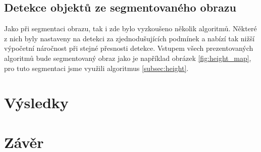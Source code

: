 \documentclass[twoside]{ctuthesis}
\begin{document}
\subsection{Detekce objektů ze segmentovaného obrazu}
Jako při segmentaci obrazu, tak i zde bylo vyzkoušeno několik algoritmů. Některé z nich byly nastaveny na detekci za zjednodušujících podmínek a nabízí tak nižší výpočetní náročnost při stejné přesnosti detekce. Vstupem všech prezentovaných algoritmů bude segmentovaný obraz jako je například obrázek \ref{fig:height_map}, pro tuto segmentaci jsme využili algoritmus \ref{subsec:height}.

\section{Výsledky}
\label{sec:výsledky}

\section{Závěr}
\label{sec:závěr}




\end{document}
